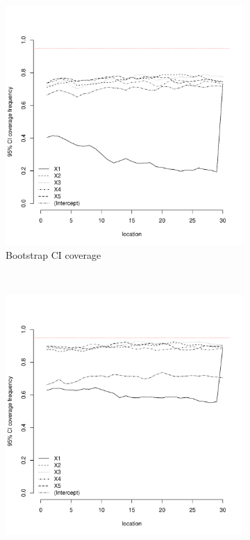 \documentclass[authoryear, review, 11pt]{elsarticle}
\begin{document}
\begin{figure}
	\vspace{-30mm}
	\centering
	\begin{subfigure}[b]{0.45\textwidth}
	\centering
		\includegraphics[width=\textwidth]{../../figures/simulation/15.34.profile_bootstrap_coverage.pdf}
		\caption{Bootstrap CI coverage}
	\end{subfigure}%
	~ %
	\begin{subfigure}[b]{0.45\textwidth}
	\centering
		\includegraphics[width=\textwidth]{../../figures/simulation/15.34.profile_se_coverage.pdf}

\end{subfigure}
\end{figure}
\end{document}
